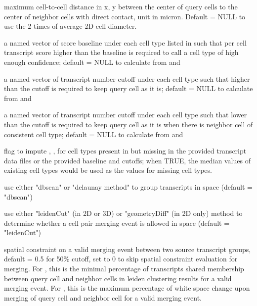\documentclass[letterpaper]{book}
\begin{document}
\begin{Arguments}
\begin{ldescription}
\item[\code{cellular\_distance\_cutoff}] maximum cell-to-cell distance in x, y between the center of query cells to the center of neighbor cells with direct contact, unit in micron. Default = NULL to use the 2 times of average 2D cell diameter.

\item[\code{score\_baseline}] a named vector of score baseline under each cell type listed in  such that  per cell transcript score higher than the baseline is required to call a cell type of high enough confidence; default = NULL to calculate from  and 

\item[\code{lowerCutoff\_transNum}] a named vector of transcript number cutoff under each cell type such that higher than the cutoff is required to keep query cell as it is; default = NULL to calculate from  and 

\item[\code{higherCutoff\_transNum}] a named vector of transcript number cutoff under each cell type such that lower than the cutoff is required to keep query cell as it is when there is neighbor cell of consistent cell type; default = NULL to calculate from  and 

\item[\code{imputeFlag\_missingCTs}] flag to impute , , for cell types present in  but missing in the provided transcript data files or the provided baseline and cutoffs; when TRUE, the median values of existing cell types would be used as the values for missing cell types.

\item[\code{groupTranscripts\_method}] use either "dbscan" or "delaunay method" to group transcripts in space (default = "dbscan")

\item[\code{spatialMergeCheck\_method}] use either "leidenCut" (in 2D or 3D) or "geometryDiff" (in 2D only) method to determine whether a cell pair merging event is allowed in space (default = "leidenCut")

\item[\code{cutoff\_spatialMerge}] spatial constraint on a valid merging event between two source transcript groups, default = 0.5 for 50\% cutoff, set to 0 to skip spatial constraint evaluation for merging.
For , this is the minimal percentage of transcripts shared membership between query cell and neighbor cells in leiden clustering results for a valid merging event.
For , this is the maximum percentage of white space change upon merging of query cell and neighbor cell for a valid merging event.


\end{ldescription}
\end{Arguments}
\end{document}
